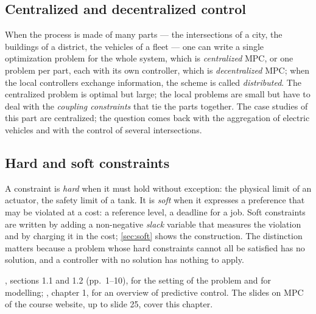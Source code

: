 \subsection{Centralized and decentralized control}

When the process is made of many parts --- the intersections of a city, the buildings of a
district, the vehicles of a fleet --- one can write a single optimization problem for the whole
system, which is \emph{centralized} MPC, or one problem per part, each with its own controller,
which is \emph{decentralized} MPC; when the local controllers exchange information, the scheme
is called \emph{distributed}. The centralized problem is optimal but large; the local problems
are small but have to deal with the \emph{coupling constraints} that tie the parts together.
The case studies of this part are centralized; the question comes back with the aggregation of
electric vehicles and with the control of several intersections.

\subsection{Hard and soft constraints}

A constraint is \emph{hard} when it must hold without exception: the physical limit of an
actuator, the safety limit of a tank. It is \emph{soft} when it expresses a preference that may
be violated at a cost: a reference level, a deadline for a job. Soft constraints are written by
adding a non-negative \emph{slack} variable that measures the violation and by charging it in the
cost; \cref{sec:soft} shows the construction. The distinction matters because a problem whose
hard constraints cannot all be satisfied has no solution, and a controller with no solution has
nothing to apply.

\begin{reading}
, sections 1.1 and 1.2 (pp.~1--10), for the setting of the problem and for
modelling; , chapter 1, for an overview of predictive control. The slides on
MPC of the course website, up to slide 25, cover this chapter.
\end{reading}
